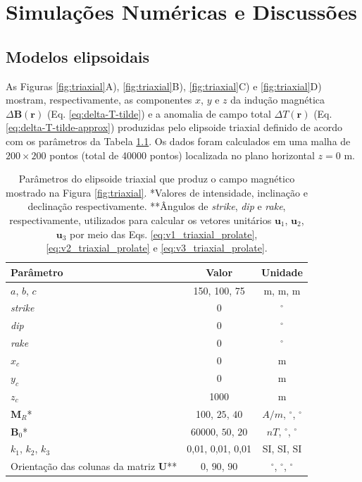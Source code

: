 \chapter{Simulações Numéricas e Discussões}

\section{Modelos elipsoidais}

As Figuras \ref{fig:triaxial}A), \ref{fig:triaxial}B), \ref{fig:triaxial}C) e \ref{fig:triaxial}D) mostram, respectivamente, as componentes $x$, $y$ e $z$ da indução magnética $\Delta \mathbf{B}(\mathbf{r})$ (Eq. \ref{eq:delta-T-tilde}) e a
anomalia de campo total $\Delta T (\mathbf{r})$ (Eq. \ref{eq:delta-T-tilde-approx}) produzidas pelo elipsoide triaxial definido de acordo com os parâmetros da Tabela \ref{tab:triaxial}.
Os dados foram calculados em uma malha de $200 \times 200$ pontos (total de 40000 pontos) localizada no plano horizontal $z = 0$ m.

\begin{table}[h]
	\begin{center}
		\begin{tabular}{|l|c|c|}
			\hline
			\textbf{Parâmetro}  & \textbf{Valor}  & \textbf{Unidade} \\
			\hline 
			$a$, $b$, $c$   & 150, 100, 75 & m, m, m\\
			\hline
			\textit{strike}   & $0$ & $^{\circ}$\\
			\hline
			\textit{dip} & $0$ & $^{\circ}$\\
			\hline
			\textit{rake} & $0$  & $^{\circ}$\\
			\hline
			$x_{c}$   & 0  & m\\
			\hline          
			$y_{c}$   & 0  & m\\
			\hline                
			$z_{c}$   & 1000 & m\\
			\hline
			$\mathbf{M}_{R}$*  & 100, $25$, $40$  & $A/m$, $^{\circ}$, $^{\circ}$\\
			\hline
			$\mathbf{B}_{0}$*    & 60000, $50$, $20$ & $nT$, $^{\circ}$, $^{\circ}$\\
			\hline
			$k_{1}$, $k_{2}$, $k_{3}$   & 0,01, 0,01, 0,01  & SI, SI, SI\\
			\hline
			Orientação das colunas da matriz $\mathbf{U}$**   & $0$, $90$, $90$  & $^{\circ}$, $^{\circ}$, $^{\circ}$\\
			\hline
		\end{tabular}
		\caption{Parâmetros do elipsoide triaxial que produz o campo magnético mostrado na Figura \ref{fig:triaxial}. *Valores de intensidade, inclinação e declinação respectivamente. **Ângulos de \textit{strike}, \textit{dip}  e \textit{rake}, respectivamente, utilizados para calcular os vetores unitários $\mathbf{u}_{1}$, $\mathbf{u}_{2}$, $\mathbf{u}_{3}$ por meio das Eqs. \ref{eq:v1_triaxial_prolate}, \ref{eq:v2_triaxial_prolate} e \ref{eq:v3_triaxial_prolate}.}
	\end{center}
	\label{tab:triaxial}
\end{table}
\newpage

